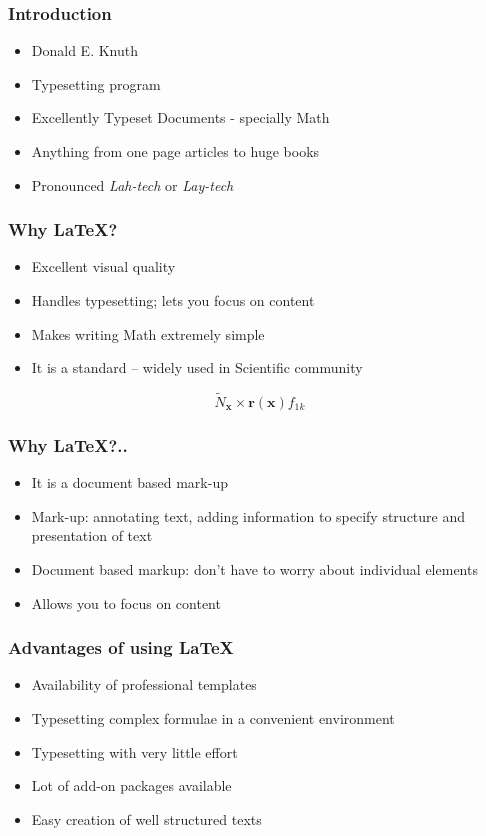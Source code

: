 \documentclass[17pt,compress]{beamer}
\begin{document}
\begin{frame}[fragile]
  \frametitle{Introduction}
    \begin{itemize}
     \item Donald E. Knuth
      \item Typesetting program
      \item Excellently Typeset Documents - specially Math
      \item Anything from one page articles to huge books
      \item Pronounced \emph{Lah-tech} or \emph{Lay-tech}
    \end{itemize}
\end{frame}

\begin{frame}[fragile]
  \frametitle{Why {\LaTeX}?}
  \begin{itemize}
  \item Excellent visual quality
  \item Handles typesetting; lets you focus on content
  \item Makes writing Math extremely simple
  \item It is a standard -- widely used in Scientific community
  \end{itemize}
    \[\tilde{N}_{\mathbf{x}}\times \mathbf{r}(\mathbf{x}) f_{1k} \]
\end{frame}

\begin{frame}[fragile]
  \frametitle{Why \LaTeX?..}
  \begin{itemize}
  \item It is a document based mark-up
  \item Mark-up: annotating text, adding
    information to specify structure and presentation of text
  \item Document based markup: don't have to worry
    about individual elements
  \item Allows you to focus on content
  \end{itemize}
\end{frame}

\begin{frame}[fragile]
  \frametitle{Advantages of using \LaTeX }
  \begin{itemize}
    \item Availability of professional templates
    \item Typesetting complex formulae in a convenient environment
    \item Typesetting with very little effort
    \item Lot of add-on packages available
    \item Easy creation of well structured texts
  \end{itemize}
\end{frame}
\end{document}
